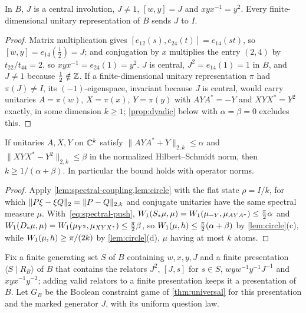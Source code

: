 \begin{lemma}\label{lem:abels-relations}
In $B$, $J$ is a central involution, $J\ne1$, $[w,y]=J$ and $xyx^{-1}=y^2$. Every finite-dimensional unitary representation of
$B$ sends $J$ to $I$.
\end{lemma}

\begin{proof}
Matrix multiplication gives $[e_{12}(s),e_{24}(t)]=e_{14}(st)$, so $[w,y]=e_{14}(\frac12)=J$; and conjugation by $x$ multiplies the
entry $(2,4)$ by $t_{22}/t_{44}=2$, so $xyx^{-1}=e_{24}(1)=y^2$. $J$ is central, $J^2=e_{14}(1)=1$ in $B$, and $J\ne1$ because
$\frac12\notin\mathbb Z$. If a finite-dimensional unitary representation $\pi$ had $\pi(J)\ne I$, its $(-1)$-eigenspace, invariant because $J$ is
central, would carry unitaries $A=\pi(w)$, $X=\pi(x)$, $Y=\pi(y)$ with $AYA^*=-Y$ and $XYX^*=Y^2$ exactly, in some dimension $k\ge1$;
\cref{prop:dyadic} below with $\alpha=\beta=0$ excludes this.
\end{proof}

\begin{proposition}\label{prop:dyadic}
If unitaries $A,X,Y$ on $\mathbb C^k$ satisfy $\|AYA^*+Y\|_{2,k}\le\alpha$ and $\|XYX^*-Y^2\|_{2,k}\le\beta$ in the normalized Hilbert--Schmidt
norm, then $k\ge1/(\alpha+\beta)$. In particular the bound holds with operator norms.
\end{proposition}

\begin{proof}
Apply \cref{lem:spectral-coupling,lem:circle} with the flat state $\rho=I/k$, for which $\lVert P\xi-\xi Q\rVert_2=\|P-Q\|_{2,k}$ and conjugate
unitaries have the same spectral measure $\mu$. With~\eqref{eq:spectral-push}, $W_1(S_*\mu,\mu)=W_1(\mu_{-Y},\mu_{AYA^*})\le\frac\pi2\alpha$
and $W_1(D_*\mu,\mu)=W_1(\mu_{Y^2},\mu_{XYX^*})\le\frac\pi2\beta$, so $W_1(\mu,h)\le\frac\pi2(\alpha+\beta)$ by \cref{lem:circle}(c),
while $W_1(\mu,h)\ge\pi/(2k)$ by \cref{lem:circle}(d), $\mu$ having at most $k$ atoms.
\end{proof}

Fix a finite generating set $S$ of $B$ containing $w,x,y,J$ and a finite presentation $\langle S\mid R_B\rangle$ of $B$ that contains
the relators $J^2$, $[J,s]$ for $s\in S$, $wyw^{-1}y^{-1}J^{-1}$ and $xyx^{-1}y^{-2}$; adding valid relators to a finite presentation
keeps it a presentation of $B$. Let $G_B$ be the Boolean constraint game of \cref{thm:universal} for this presentation and the
marked generator $J$, with its uniform question law.

